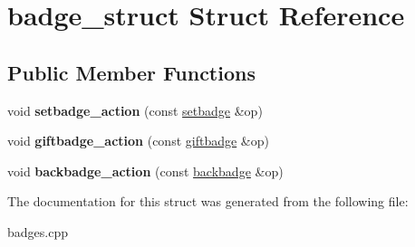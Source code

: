 \hypertarget{structbadge__struct}{}\section{badge\+\_\+struct Struct Reference}
\label{structbadge__struct}
\subsection*{Public Member Functions}
\begin{DoxyCompactItemize}
\item 
\mbox{\label{structbadge__struct_a66403d83fdc587d59b4124b65733ff4e}} 
void {\bfseries setbadge\+\_\+action} (const \mbox{\hyperlink{structeosio_1_1setbadge}{setbadge}} \&op)
\item 
\mbox{\label{structbadge__struct_ab013e63941cf00e26f9d208f84fc5c71}} 
void {\bfseries giftbadge\+\_\+action} (const \mbox{\hyperlink{structeosio_1_1giftbadge}{giftbadge}} \&op)
\item 
\mbox{\label{structbadge__struct_a3b12637b107f7c10e0dc2956fec04c02}} 
void {\bfseries backbadge\+\_\+action} (const \mbox{\hyperlink{structeosio_1_1backbadge}{backbadge}} \&op)
\end{DoxyCompactItemize}


The documentation for this struct was generated from the following file\+:\begin{DoxyCompactItemize}
\item 
badges.\+cpp\end{DoxyCompactItemize}
